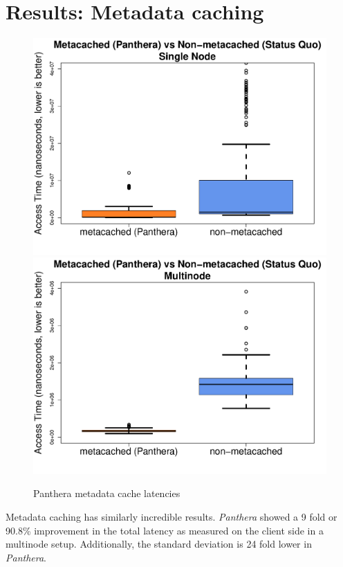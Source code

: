 \documentclass{article}
\begin{document}
\section{Results: Metadata caching}
\begin{figure}[!h]
	\caption{Panthera metadata cache latencies}
	\centering
		\includegraphics[scale=0.3]{assets/box-plot-metadata.pdf}
		\includegraphics[scale=0.3]{assets/box-plot-metadata-multinode.pdf}
\end{figure}

Metadata caching has similarly incredible results. \textit{Panthera} showed a 9 fold or 90.8\% improvement in the total latency as measured on the client side in a multinode setup. Additionally, the standard deviation is 24 fold lower in \textit{Panthera}.
\end{document}
